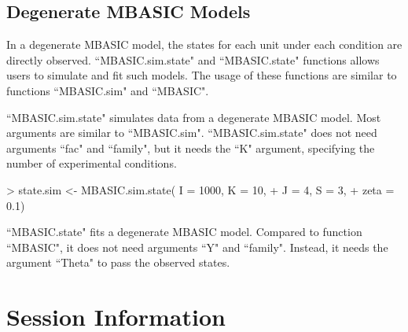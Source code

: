 \documentclass[a4paper,10pt]{article}
\begin{document}
\subsection{Degenerate MBASIC Models}

In a degenerate MBASIC model, the states for each unit under each condition are directly observed. ``MBASIC.sim.state" and ``MBASIC.state" functions allows users to simulate and fit such models. The usage of these functions are similar to functions ``MBASIC.sim" and ``MBASIC".

``MBASIC.sim.state" simulates data from a degenerate MBASIC model. Most arguments are similar to ``MBASIC.sim". ``MBASIC.sim.state" does not need arguments ``fac" and ``family", but it needs the ``K" argument, specifying the number of experimental conditions.

\begin{Schunk}
\begin{Sinput}
> state.sim <- MBASIC.sim.state( I = 1000, K = 10,
+                               J = 4, S = 3,
+                               zeta = 0.1)
\end{Sinput}
\end{Schunk}

``MBASIC.state" fits a degenerate MBASIC model. Compared to function ``MBASIC", it does not need arguments ``Y" and ``family". Instead, it needs the argument ``Theta" to pass the observed states.

\begin{Schunk}
\end{Schunk}

\section{Session Information}
\end{document}
